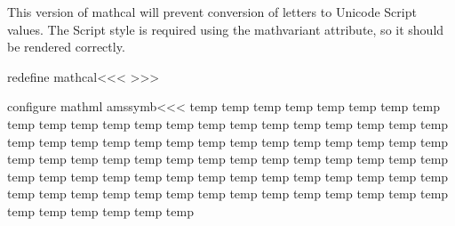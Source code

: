 {{{{{{This version of mathcal will prevent conversion of letters to Unicode Script values. 
The Script style is required using the mathvariant attribute, so it should be 
rendered correctly.

\<redefine mathcal\><<<
\def\:tempa#1{\bgroup{}#1\egroup}
\HLet\mathcal\:tempa
>>>


\<configure mathml amssymb\><<<
\def\:tempa#1"#2#3///{%
   \edef\:next{\noexpand\Configure{MathClass}{\ifnum 0=#2
                                     \mathordMathClass \else #2\fi}}%
   \:next
}
\def\:temp#1{\expandafter\:tempc\meaning#1//}
\def\:tempb#1{\:tempa#1///{}{}{}{#1}}
\def\:tempc#1"#2//{\:tempd#2...//}
\def\:tempd#1#2#3#4#5//{%
   \if #4.\:tempb{\mathchar"0#1#2#3}\else
          \:tempb{\mathchar"#1#2#3#4}\fi
}
\:temp \boxdot
\:temp \boxplus
\:temp \boxtimes
\:temp \centerdot
\:temp \boxminus
\:temp \veebar
\:temp \barwedge
\:temp \doublebarwedge
\:temp \Cup
\:temp \Cap
\:temp \curlywedge
\:temp \curlyvee
\:temp \leftthreetimes
\:temp \rightthreetimes
\:temp \dotplus
\:temp \intercal
\:temp \circledcirc
\:temp \circledast
\:temp \circleddash
\:temp \divideontimes
\:temp \lessdot
\:temp \gtrdot
\:temp \ltimes
\:temp \rtimes
\:temp \smallsetminus
\:temp \circlearrowright
\:temp \circlearrowleft
\:temp \leftrightharpoons
\:temp \Vdash
\:temp \Vvdash
\:temp \vDash
\:temp \twoheadrightarrow
\:temp \twoheadleftarrow
\:temp \leftleftarrows
\:temp \rightrightarrows
\:temp \upuparrows
\:temp \downdownarrows
\:temp \upharpoonright
\:temp \downharpoonright
\:temp \upharpoonleft
\:temp \downharpoonleft
\:temp \rightarrowtail
\:temp \leftarrowtail
\:temp \leftrightarrows
\:temp \rightleftarrows
\:temp \Lsh
\:temp \Rsh
\:temp \rightsquigarrow
\:temp \leftrightsquigarrow
\:temp \looparrowleft
\:temp \looparrowright
\:temp \circeq
\:temp \succsim
\:temp \gtrsim
\:temp \gtrapprox
\:temp \multimap
\:temp \therefore
\:temp \because
\:temp \doteqdot
\:temp \triangleq
\:temp \precsim
\:temp \lesssim
\:temp \lessapprox
\:temp \eqslantless
\:temp \eqslantgtr
\:temp \curlyeqprec
\:temp \curlyeqsucc
\:temp \preccurlyeq
\:temp \leqq
\:temp \leqslant
\:temp \lessgtr
\:temp \risingdotseq
\:temp \fallingdotseq
\:temp \succcurlyeq
\:temp \geqq
\:temp \geqslant
\:temp \gtrless
\:temp \vartriangleright
\:temp \vartriangleleft
\:temp \trianglerighteq
\:temp \trianglelefteq
\:temp \between
\:temp \blacktriangleright
\:temp \blacktriangleleft
}}}}}}
